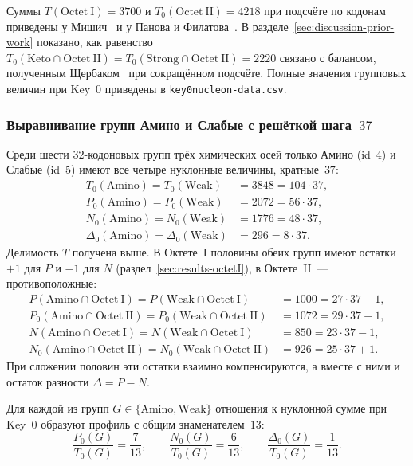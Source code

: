 \documentclass[11pt,a4paper]{article}
\renewcommand{\_}{\origunderscore\allowbreak}
\begin{document}
Суммы $T(\mathrm{Octet~I})=3700$ и $T_{0}(\mathrm{Octet~II})=4218$ при
подсчёте по кодонам приведены у Мишич~\cite[табл.~3]{misic2016} и у
Панова и Филатова~\cite{panov2024}. В разделе~\ref{sec:discussion-prior-work}
показано, как равенство $T_{0}(\mathrm{Keto}\cap\mathrm{Octet~II})
=T_{0}(\mathrm{Strong}\cap\mathrm{Octet~II})=2220$ связано с балансом,
полученным Щербаком~\cite{shcherbak1993,shcherbak2003} при сокращённом подсчёте. Полные значения групповых
величин при Key~0 приведены в
\texttt{key0\_nucleon-data.csv}.

\subsubsection{Выравнивание групп Амино и Слабые с решёткой
шага~\texorpdfstring{$37$}{37}}
\label{sec:results-key0-aminoweak}

Среди шести $32$-кодоновых групп трёх химических осей только Амино
(id~4) и Слабые (id~5) имеют все четыре нуклонные величины,
кратные~$37$:
\[
\begin{aligned}
T_{0}(\mathrm{Amino})=T_{0}(\mathrm{Weak})
  &=3848=104\cdot37, \\
P_{0}(\mathrm{Amino})=P_{0}(\mathrm{Weak})
  &=2072=56\cdot37, \\
N_{0}(\mathrm{Amino})=N_{0}(\mathrm{Weak})
  &=1776=48\cdot37, \\
\Delta_{0}(\mathrm{Amino})=\Delta_{0}(\mathrm{Weak})
  &=296=8\cdot37.
\end{aligned}
\]
Делимость $T$ получена выше. В Октете~I половины обеих групп имеют
остатки $+1$ для $P$ и $-1$ для $N$
(раздел~\ref{sec:results-octetI}), в Октете~II~--- противоположные:
\[
\begin{aligned}
P(\mathrm{Amino}\cap\mathrm{Octet~I})
  =P(\mathrm{Weak}\cap\mathrm{Octet~I})
  &=1000=27\cdot37+1, \\
P_{0}(\mathrm{Amino}\cap\mathrm{Octet~II})
  =P_{0}(\mathrm{Weak}\cap\mathrm{Octet~II})
  &=1072=29\cdot37-1, \\
N(\mathrm{Amino}\cap\mathrm{Octet~I})
  =N(\mathrm{Weak}\cap\mathrm{Octet~I})
  &=850=23\cdot37-1, \\
N_{0}(\mathrm{Amino}\cap\mathrm{Octet~II})
  =N_{0}(\mathrm{Weak}\cap\mathrm{Octet~II})
  &=926=25\cdot37+1.
\end{aligned}
\]
При сложении половин эти остатки взаимно компенсируются, а вместе с
ними и остаток разности $\Delta=P-N$.

Для каждой из групп $G\in\{\mathrm{Amino},\mathrm{Weak}\}$
отношения к нуклонной сумме при Key~0 образуют профиль
с общим знаменателем~$13$:
\[
\frac{P_0(G)}{T_0(G)}=\frac{7}{13},\qquad
\frac{N_0(G)}{T_0(G)}=\frac{6}{13},\qquad
\frac{\Delta_0(G)}{T_0(G)}=\frac{1}{13}.
\]
\end{document}
